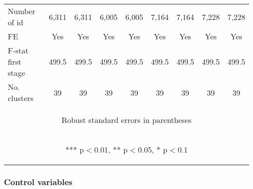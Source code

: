 \documentclass{article}
\begin{document}
\begin{table}[htbp]
{\begin{tabular}{lcccccccc}
Number of id & 6,311 & 6,311 & 6,005 & 6,005 & 7,164 & 7,164 & 7,228 & 7,228 \\
FE & Yes & Yes & Yes & Yes & Yes & Yes & Yes & Yes \\
F-stat first stage & 499.5 & 499.5 & 499.5 & 499.5 & 499.5 & 499.5 & 499.5 & 499.5 \\
No. clusters & 39 & 39 & 39 & 39 & 39 & 39 & 39 & 39 \\ \hline
\multicolumn{9}{c}{\begin{footnotesize} Robust standard errors in parentheses\end{footnotesize}} \\
\multicolumn{9}{c}{\begin{footnotesize} *** p$<$0.01, ** p$<$0.05, * p$<$0.1\end{footnotesize}} \\
\end{tabular}
}
\end{table}

\subsubsection{Control variables}
\end{document}
